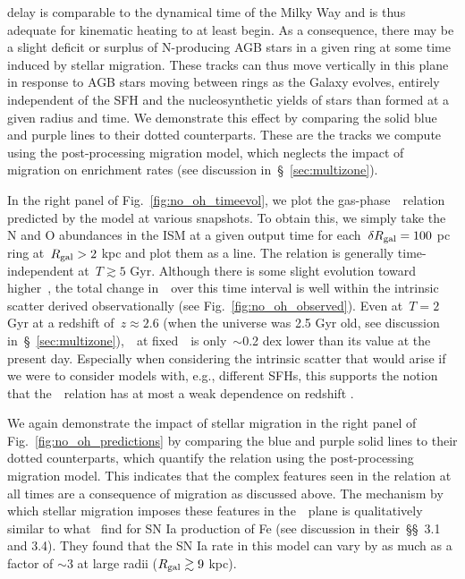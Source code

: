 \documentclass[ms.tex]{subfiles}
\begin{document}
delay is comparable to the dynamical time of the Milky Way and is thus adequate
for kinematic heating to at least begin.
As a consequence, there may be a slight deficit or surplus of N-producing AGB
stars in a given ring at some time induced by stellar migration.
These tracks can thus move vertically in this plane in response to AGB stars
moving between rings as the Galaxy evolves, entirely independent of the SFH and
the nucleosynthetic yields of stars than formed at a given radius and time.
We demonstrate this effect by comparing the solid blue and purple lines to
their dotted counterparts.
These are the tracks we compute using the post-processing migration model,
which neglects the impact of migration on enrichment rates (see discussion
in~\S~\ref{sec:multizone}).
\par
In the right panel of Fig.~\ref{fig:no_oh_timeevol}, we plot the
gas-phase~\ohno~relation predicted by the model at various snapshots.
To obtain this, we simply take the N and O abundances in the ISM at a given
output time for each~$\delta R_\text{gal} = 100$ pc ring at~$R_\text{gal} > 2$ kpc and plot
them as a line.
The relation is generally time-independent at~$T \gtrsim 5$ Gyr.
Although there is some slight evolution toward higher~\no, the total change
in~\no~over this time interval is well within the intrinsic scatter derived
observationally (see Fig.~\ref{fig:no_oh_observed}).
Even at~$T = 2$ Gyr at a redshift of~$z \approx 2.6$ (when the universe was
2.5 Gyr old, see discussion in~\S~\ref{sec:multizone}),~\no~at
fixed~\oh~is only~$\sim$0.2 dex lower than its value at the present day.
Especially when considering the intrinsic scatter that would arise if we were
to consider models with, e.g., different SFHs, this supports the notion that
the~\ohno~relation has at most a weak dependence on redshift
\citep{Vincenzo2018, HaydenPawson2021}.
\par
We again demonstrate the impact of stellar migration in the right panel of
Fig.~\ref{fig:no_oh_predictions} by comparing the blue and purple solid lines
to their dotted counterparts, which quantify the relation using the
post-processing migration model.
This indicates that the complex features seen in the relation at all times are
a consequence of migration as discussed above.
The mechanism by which stellar migration imposes these features in
the~\ohno~plane is qualitatively similar to what~\citet{Johnson2021} find for
SN Ia production of Fe (see discussion in their~\S\S~3.1 and 3.4).
They found that the SN Ia rate in this model can vary by as much as a factor of
$\sim$3 at large radii ($R_\text{gal} \gtrsim 9$ kpc).
\end{document}
